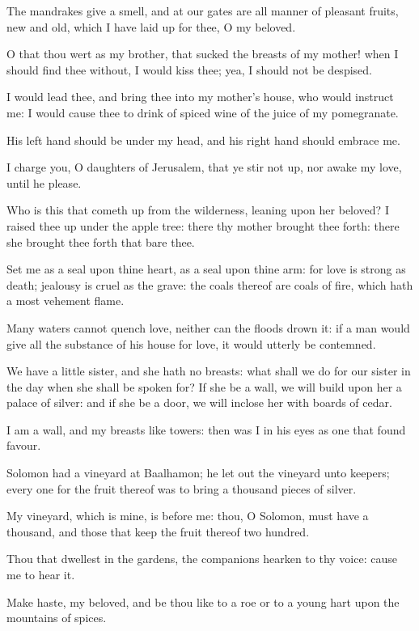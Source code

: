 \Verse The mandrakes give a smell, and at our gates are all manner of pleasant fruits, new and old, which I have laid up for thee, O my beloved.


\Chapter
\Verse O that thou wert as my brother, that sucked the breasts of my mother!  when I should find thee without, I would kiss thee; yea, I should not be despised.

\Verse I would lead thee, and bring thee into my mother's house, who would instruct me: I would cause thee to drink of spiced wine of the juice of my pomegranate.

\Verse His left hand should be under my head, and his right hand should embrace me.

\Verse I charge you, O daughters of Jerusalem, that ye stir not up, nor awake my love, until he please.

\Verse Who is this that cometh up from the wilderness, leaning upon her beloved? I raised thee up under the apple tree: there thy mother brought thee forth: there she brought thee forth that bare thee.

\Verse Set me as a seal upon thine heart, as a seal upon thine arm: for love is strong as death; jealousy is cruel as the grave: the coals thereof are coals of fire, which hath a most vehement flame.

\Verse Many waters cannot quench love, neither can the floods drown it: if a man would give all the substance of his house for love, it would utterly be contemned.

\Verse We have a little sister, and she hath no breasts: what shall we do for our sister in the day when she shall be spoken for?  \Verse If she be a wall, we will build upon her a palace of silver: and if she be a door, we will inclose her with boards of cedar.

\Verse I am a wall, and my breasts like towers: then was I in his eyes as one that found favour.

\Verse Solomon had a vineyard at Baalhamon; he let out the vineyard unto keepers; every one for the fruit thereof was to bring a thousand pieces of silver.

\Verse My vineyard, which is mine, is before me: thou, O Solomon, must have a thousand, and those that keep the fruit thereof two hundred.

\Verse Thou that dwellest in the gardens, the companions hearken to thy voice: cause me to hear it.

\Verse Make haste, my beloved, and be thou like to a roe or to a young hart upon the mountains of spices.

